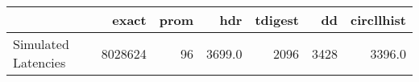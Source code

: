 \begin{tabular}{lrrrrrr}
\toprule
{} &    exact &  prom &     hdr &  tdigest &    dd &  circllhist \\
\midrule
Simulated Latencies &  8028624 &    96 &  3699.0 &     2096 &  3428 &      3396.0 \\
\bottomrule
\end{tabular}
